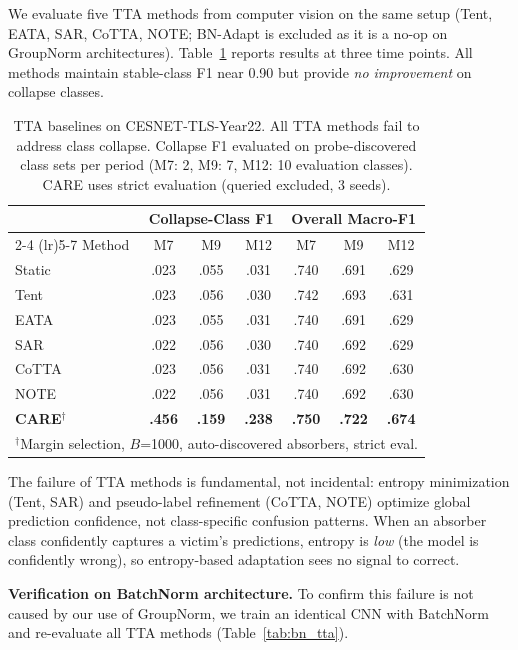 \documentclass[journal]{IEEEtran}
\newcommand{\ours}{CARE}  %
\begin{document}
We evaluate five TTA methods from computer vision on the same setup (Tent, EATA, SAR, CoTTA, NOTE; BN-Adapt is excluded as it is a no-op on GroupNorm architectures).
Table~\ref{tab:tta_baselines} reports results at three time points.
All methods maintain stable-class F1 near 0.90 but provide \textit{no improvement} on collapse classes.

\begin{table}[t]
\centering
\caption{TTA baselines on CESNET-TLS-Year22. All TTA methods fail to address class collapse. Collapse F1 evaluated on probe-discovered class sets per period (M7: 2, M9: 7, M12: 10 evaluation classes). \ours{} uses strict evaluation (queried excluded, 3 seeds).}
\label{tab:tta_baselines}
\small
\begin{tabular}{@{}l ccc ccc@{}}
\toprule
& \multicolumn{3}{c}{Collapse-Class F1} & \multicolumn{3}{c}{Overall Macro-F1} \\
\cmidrule(lr){2-4} \cmidrule(lr){5-7}
Method & M7 & M9 & M12 & M7 & M9 & M12 \\
\midrule
Static     & .023 & .055 & .031 & .740 & .691 & .629 \\
Tent       & .023 & .056 & .030 & .742 & .693 & .631 \\
EATA       & .023 & .055 & .031 & .740 & .691 & .629 \\
SAR        & .022 & .056 & .030 & .740 & .692 & .629 \\
CoTTA      & .023 & .056 & .031 & .740 & .692 & .630 \\
NOTE       & .022 & .056 & .031 & .740 & .692 & .630 \\
\midrule
\textbf{\ours{}}$^\dagger$ & \textbf{.456} & \textbf{.159} & \textbf{.238} & \textbf{.750} & \textbf{.722} & \textbf{.674} \\
\bottomrule
\multicolumn{7}{l}{\footnotesize $^\dagger$Margin selection, $B$=1000, auto-discovered absorbers, strict eval.}
\end{tabular}
\end{table}

The failure of TTA methods is fundamental, not incidental: entropy minimization (Tent, SAR) and pseudo-label refinement (CoTTA, NOTE) optimize global prediction confidence, not class-specific confusion patterns.
When an absorber class confidently captures a victim's predictions, entropy is \textit{low} (the model is confidently wrong), so entropy-based adaptation sees no signal to correct.

\textbf{Verification on BatchNorm architecture.}
To confirm this failure is not caused by our use of GroupNorm, we train an identical CNN with BatchNorm and re-evaluate all TTA methods (Table~\ref{tab:bn_tta}).
\end{document}
